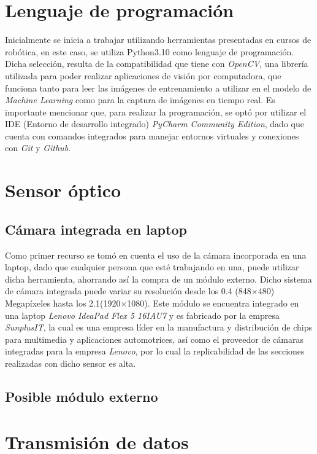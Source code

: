 \section{Lenguaje de programación}
Inicialmente se inicia a trabajar utilizando herramientas presentadas en cursos de robótica, en este caso, se utiliza Python3.10 como lenguaje de programación. Dicha selección, resulta de la compatibilidad que tiene con \textit{OpenCV}, una librería utilizada para poder realizar aplicaciones de visión por computadora, que funciona tanto para leer las imágenes de entrenamiento a utilizar en el modelo de \textit{Machine Learning} como para la captura de imágenes en tiempo real. Es importante mencionar que, para realizar la programación, se optó por utilizar el IDE (Entorno de desarrollo integrado) \textit{PyCharm Community Edition}, dado que cuenta con comandos integrados para manejar entornos virtuales y conexiones con \textit{Git} y \textit{Github}.


\section{Sensor óptico}
\subsection{Cámara integrada en laptop}
Como primer recurso se tomó en cuenta el uso de la cámara incorporada en una laptop, dado que cualquier persona que esté trabajando en una, puede utilizar dicha herramienta, ahorrando así la compra de un módulo externo. Dicho sistema de cámara integrada puede variar su resolución desde los 0.4 (848$\times$480) Megapíxeles hasta los 2.1(1920$\times$1080). Este módulo se encuentra integrado en una laptop \textit{Lenovo IdeaPad Flex 5 16IAU7} y es fabricado por la empresa \textit{SunplusIT}, la cual es una empresa líder en la manufactura y distribución de chips para multimedia y aplicaciones automotrices, así como el proveedor de cámaras integradas para la empresa \textit{Lenovo}, por lo cual la replicabilidad de las secciones realizadas con dicho sensor es alta.

\subsection{Posible módulo externo}

\section{Transmisión de datos}
